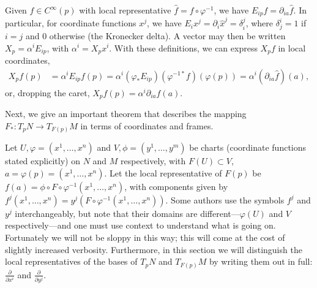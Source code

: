 \documentclass[psamsfonts]{amsart}
\theoremstyle{definition}
\theoremstyle{remark}
\numberwithin{equation}{section}
\begin{document}
Given $f\in C^{\infty}(p)$ with local representative $\hat f = f\circ \varphi^{-1}$, we have $E_{ip}f = \partial_{ia}\hat f$. In particular, for coordinate functions $x^j$, we have $E_i x^j = \partial_i \hat x^j = \delta_{i}^j$, where $\delta^i_j = 1$ if $i=j$ and $0$ otherwise (the Kronecker delta). A vector may then be written $X_p = \alpha^i E_{ip}$, with $\alpha^i = X_p x^i$. 
With these definitions, we can express $X_pf$ in local coordinates, 
\begin{equation}
\begin{aligned}
X_pf(p) & = {} \alpha^i E_{ip}f(p) = {} \alpha^i (\varphi_* E_{ip})(\varphi^{-1*}f)(\varphi(p)) = {} \alpha^i \left(\partial_{ia}\hat f\right)(a),%
\end{aligned}
\end{equation}
or, dropping the caret, $X_p f(p) = \alpha^i\partial_{ia} f(a)$. 

Next, we give an important theorem that describes the mapping $F_*:T_pN \rightarrow T_{F(p)}M$ in terms of coordinates and frames.  %

Let $U, \varphi = (x^1, \dots, x^n)$ and $V, \phi = (y^1, \dots, y^m)$ be charts (coordinate functions stated explicitly) on $N$ and $M$ respectively, with $F(U)\subset V$, $a = \varphi(p) = (x^1, \dots, x^n)$. Let the local representative of $F(p)$ be $f(a) = \phi \circ F \circ \varphi^{-1}(x^1, \dots, x^n)$, with components given by $f^j(x^1, \dots, x^n) = y^j(F\circ \varphi^{-1}(x^1, \dots, x^n))$. Some authors use the symbols $f^j$ and $y^j$ interchangeably, but note that their domains are different---$\varphi(U)$ and $V$ respectively---and one must use context to understand what is going on. Fortunately we will not be sloppy in this way; this will come at the cost of slightly increased verbosity. Furthermore, in this section we will distinguish the local representatives of the bases of $T_pN$ and $T_{F(p)}M$ by writing them out in full: $\frac{\partial}{\partial x^i}$ and $\frac{\partial}{\partial y^j}$. 
\end{document}

